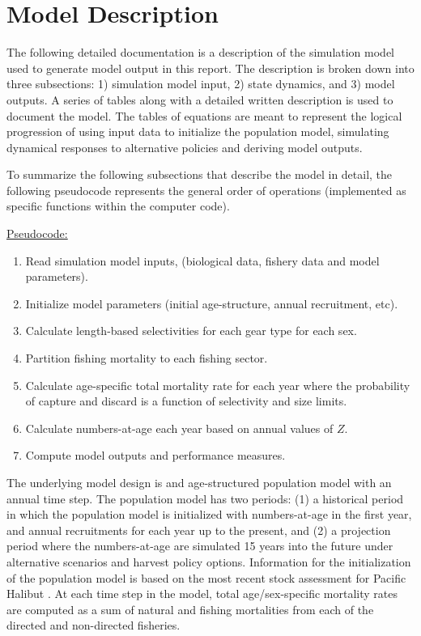 
\section{Model Description} %
\label{sec:model_description}

The following detailed documentation is a description of the simulation model used to generate model output in this report.  The description is broken down into three subsections: 1) simulation model input, 2) state dynamics, and 3) model outputs.  A series of tables along with a detailed written description is used to document the model.  The tables of equations are meant to represent the logical progression of using input data to initialize the population model, simulating dynamical responses to alternative policies and deriving model outputs.

To summarize the following subsections that describe the model in detail, the following pseudocode represents the general order of operations (implemented as specific functions within the computer code).

\noindent\underline{Pseudocode:}
\begin{enumerate}
	\item Read simulation model inputs, (biological data, fishery data and model parameters).
	\item Initialize model parameters (initial age-structure, annual recruitment, etc).
	\item Calculate length-based selectivities for each gear type for each sex.
	\item Partition fishing mortality to each fishing sector.
	\item Calculate age-specific total mortality rate for each year where the probability of capture and discard is a function of selectivity and size limits.
	\item Calculate numbers-at-age each year based on annual values of $Z$.
	\item Compute model outputs and performance measures.
\end{enumerate}

The underlying model design is and age-structured population model with an annual time step.  The population model has two periods: (1) a historical period in which the population model is initialized with numbers-at-age in the first year, and annual recruitments for each year up to the present, and (2) a projection period where the numbers-at-age are simulated 15 years into the future under alternative scenarios and harvest policy options.  Information for the initialization of the population model is based on the most recent stock assessment for Pacific Halibut \citep{Hare2012Rara}.  At each time step in the model, total age/sex-specific mortality rates are computed as a sum of natural and fishing mortalities from each of the directed and non-directed fisheries.

